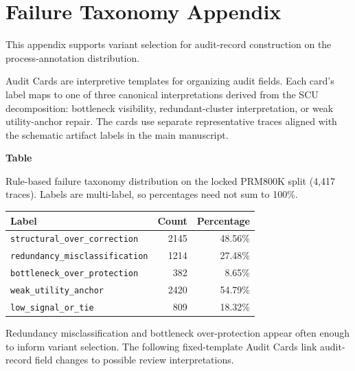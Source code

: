 \documentclass[pdflatex,sn-mathphys-num]{sn-jnl}
\begin{document}
\section{Failure Taxonomy Appendix}
\label{app:failure-taxonomy}

This appendix supports variant selection for audit-record construction on the process-annotation distribution.

Audit Cards are interpretive templates for organizing audit fields. Each card's label maps to one of three canonical interpretations derived from the SCU decomposition: bottleneck visibility, redundant-cluster interpretation, or weak utility-anchor repair. The cards use separate representative traces aligned with the schematic artifact labels in the main manuscript.

\par\medskip
{}\label{tab:failure-taxonomy}
\noindent\textbf{Table~\thetable}\par
\noindent Rule-based failure taxonomy distribution on the locked PRM800K split (4,417 traces). Labels are multi-label, so percentages need not sum to 100\%.
\begin{center}
\small
\renewcommand{\arraystretch}{1.08}
\begin{tabular}{lrr}
\toprule
\textbf{Label} & \textbf{Count} & \textbf{Percentage} \\
\midrule
\texttt{structural\_over\_correction} & 2145 & 48.56\% \\
\texttt{redundancy\_misclassification} & 1214 & 27.48\% \\
\texttt{bottleneck\_over\_protection} & 382 & 8.65\% \\
\texttt{weak\_utility\_anchor} & 2420 & 54.79\% \\
\texttt{low\_signal\_or\_tie} & 809 & 18.32\% \\
\bottomrule
\end{tabular}
\end{center}
\medskip

Redundancy misclassification and bottleneck over-protection appear often enough to inform variant selection. The following fixed-template Audit Cards link audit-record field changes to possible review interpretations.
\end{document}
